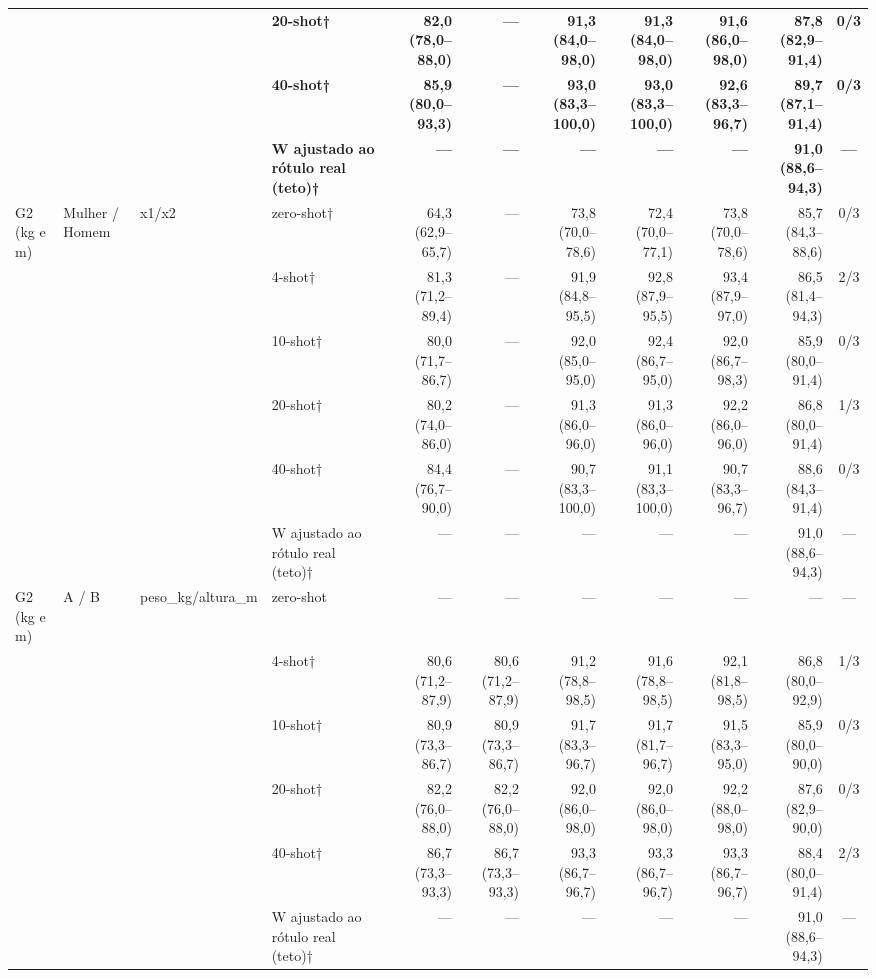 \begin{table}[htbp]
\begin{tabular}{llllrrrrrrc}
 &  &  & \textbf{20-shot†} & \textbf{82,0 (78,0–88,0)} & \textbf{—} & \textbf{91,3 (84,0–98,0)} & \textbf{91,3 (84,0–98,0)} & \textbf{91,6 (86,0–98,0)} & \textbf{87,8 (82,9–91,4)} & \textbf{0/3} \\
 &  &  & \textbf{40-shot†} & \textbf{85,9 (80,0–93,3)} & \textbf{—} & \textbf{93,0 (83,3–100,0)} & \textbf{93,0 (83,3–100,0)} & \textbf{92,6 (83,3–96,7)} & \textbf{89,7 (87,1–91,4)} & \textbf{0/3} \\
 &  &  & \textbf{W ajustado ao rótulo real (teto)†} & \textbf{—} & \textbf{—} & \textbf{—} & \textbf{—} & \textbf{—} & \textbf{91,0 (88,6–94,3)} & \textbf{—} \\
\midrule
G2 (kg e m) & Mulher / Homem & x1/x2 & zero-shot† & 64,3 (62,9–65,7) & — & 73,8 (70,0–78,6) & 72,4 (70,0–77,1) & 73,8 (70,0–78,6) & 85,7 (84,3–88,6) & 0/3 \\
 &  &  & 4-shot† & 81,3 (71,2–89,4) & — & 91,9 (84,8–95,5) & 92,8 (87,9–95,5) & 93,4 (87,9–97,0) & 86,5 (81,4–94,3) & 2/3 \\
 &  &  & 10-shot† & 80,0 (71,7–86,7) & — & 92,0 (85,0–95,0) & 92,4 (86,7–95,0) & 92,0 (86,7–98,3) & 85,9 (80,0–91,4) & 0/3 \\
 &  &  & 20-shot† & 80,2 (74,0–86,0) & — & 91,3 (86,0–96,0) & 91,3 (86,0–96,0) & 92,2 (86,0–96,0) & 86,8 (80,0–91,4) & 1/3 \\
 &  &  & 40-shot† & 84,4 (76,7–90,0) & — & 90,7 (83,3–100,0) & 91,1 (83,3–100,0) & 90,7 (83,3–96,7) & 88,6 (84,3–91,4) & 0/3 \\
 &  &  & W ajustado ao rótulo real (teto)† & — & — & — & — & — & 91,0 (88,6–94,3) & — \\
\midrule
G2 (kg e m) & A / B & peso\_kg/altura\_m & zero-shot & — & — & — & — & — & — & — \\
 &  &  & 4-shot† & 80,6 (71,2–87,9) & 80,6 (71,2–87,9) & 91,2 (78,8–98,5) & 91,6 (78,8–98,5) & 92,1 (81,8–98,5) & 86,8 (80,0–92,9) & 1/3 \\
 &  &  & 10-shot† & 80,9 (73,3–86,7) & 80,9 (73,3–86,7) & 91,7 (83,3–96,7) & 91,7 (81,7–96,7) & 91,5 (83,3–95,0) & 85,9 (80,0–90,0) & 0/3 \\
 &  &  & 20-shot† & 82,2 (76,0–88,0) & 82,2 (76,0–88,0) & 92,0 (86,0–98,0) & 92,0 (86,0–98,0) & 92,2 (88,0–98,0) & 87,6 (82,9–90,0) & 0/3 \\
 &  &  & 40-shot† & 86,7 (73,3–93,3) & 86,7 (73,3–93,3) & 93,3 (86,7–96,7) & 93,3 (86,7–96,7) & 93,3 (86,7–96,7) & 88,4 (80,0–91,4) & 2/3 \\
 &  &  & W ajustado ao rótulo real (teto)† & — & — & — & — & — & 91,0 (88,6–94,3) & — \\

\end{tabular}
\end{table}
